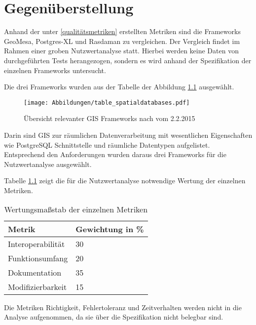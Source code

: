 \chapter{Gegenüberstellung}

Anhand der unter \ref{qualitätsmetriken} erstellten Metriken sind die Frameworks GeoMesa, Postgres-XL und Rasdaman zu vergleichen.
Der Vergleich findet im Rahmen einer groben Nutzwertanalyse statt.
Hierbei werden keine Daten von durchgeführten Tests herangezogen, sondern es wird anhand der Spezifikation der einzelnen Frameworks untersucht.

Die drei Frameworks wurden aus der Tabelle der Abbildung \ref{fig:spatialdatabases} ausgewählt.
\begin{figure}
\centering
\texttt{[image: Abbildungen/table\_spatialdatabases.pdf]}
\caption[Übersicht relevanter GIS Frameworks]{Übersicht relevanter GIS Frameworks nach \cite{website:wiki-spatialdatabase} vom 2.2.2015}
\label{fig:spatialdatabases}
\end{figure}
Darin sind GIS zur räumlichen Datenverarbeitung mit wesentlichen Eigenschaften wie PostgreSQL Schnittstelle und räumliche Datentypen aufgelistet.
Entsprechend den Anforderungen wurden daraus drei Frameworks für die Nutzwertanalyse ausgewählt.


Tabelle \ref{table:Wertungsmassstab} zeigt die für die Nutzwertanalyse notwendige Wertung der einzelnen Metriken.
\begin{table}[h]
\centering
\begin{tabular}{l|l}
\textbf{Metrik} & \textbf{Gewichtung in \%} \\ \hline
Interoperabilität & 30 \\ \hline
Funktionsumfang & 20 \\ \hline
Dokumentation & 35 \\ \hline
Modifizierbarkeit & 15
\end{tabular}
\caption{Wertungsmaßstab der einzelnen Metriken}
\label{table:Wertungsmassstab}
\end{table}
Die Metriken Richtigkeit, Fehlertoleranz und Zeitverhalten werden nicht in die Analyse aufgenommen, da sie über die Spezifikation nicht belegbar sind.

